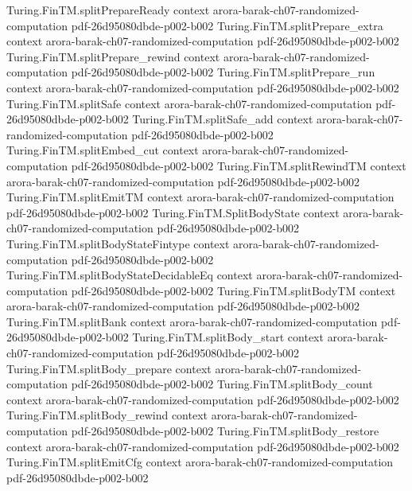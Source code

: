\begin{theorem}
  {Turing.FinTM.splitPrepareReady}
  {context}
  {arora-barak-ch07-randomized-computation}
  {pdf-26d95080dbde-p002-b002}
\proofstep
  {Turing.FinTM.splitPrepare_extra}
  {context}
  {arora-barak-ch07-randomized-computation}
  {pdf-26d95080dbde-p002-b002}
\proofstep
  {Turing.FinTM.splitPrepare_rewind}
  {context}
  {arora-barak-ch07-randomized-computation}
  {pdf-26d95080dbde-p002-b002}
\proofstep
  {Turing.FinTM.splitPrepare_run}
  {context}
  {arora-barak-ch07-randomized-computation}
  {pdf-26d95080dbde-p002-b002}
\proofstep
  {Turing.FinTM.splitSafe}
  {context}
  {arora-barak-ch07-randomized-computation}
  {pdf-26d95080dbde-p002-b002}
\proofstep
  {Turing.FinTM.splitSafe_add}
  {context}
  {arora-barak-ch07-randomized-computation}
  {pdf-26d95080dbde-p002-b002}
\proofstep
  {Turing.FinTM.splitEmbed_cut}
  {context}
  {arora-barak-ch07-randomized-computation}
  {pdf-26d95080dbde-p002-b002}
\proofstep
  {Turing.FinTM.splitRewindTM}
  {context}
  {arora-barak-ch07-randomized-computation}
  {pdf-26d95080dbde-p002-b002}
\proofstep
  {Turing.FinTM.splitEmitTM}
  {context}
  {arora-barak-ch07-randomized-computation}
  {pdf-26d95080dbde-p002-b002}
\proofstep
  {Turing.FinTM.SplitBodyState}
  {context}
  {arora-barak-ch07-randomized-computation}
  {pdf-26d95080dbde-p002-b002}
\proofstep
  {Turing.FinTM.splitBodyStateFintype}
  {context}
  {arora-barak-ch07-randomized-computation}
  {pdf-26d95080dbde-p002-b002}
\proofstep
  {Turing.FinTM.splitBodyStateDecidableEq}
  {context}
  {arora-barak-ch07-randomized-computation}
  {pdf-26d95080dbde-p002-b002}
\proofstep
  {Turing.FinTM.splitBodyTM}
  {context}
  {arora-barak-ch07-randomized-computation}
  {pdf-26d95080dbde-p002-b002}
\proofstep
  {Turing.FinTM.splitBank}
  {context}
  {arora-barak-ch07-randomized-computation}
  {pdf-26d95080dbde-p002-b002}
\proofstep
  {Turing.FinTM.splitBody_start}
  {context}
  {arora-barak-ch07-randomized-computation}
  {pdf-26d95080dbde-p002-b002}
\proofstep
  {Turing.FinTM.splitBody_prepare}
  {context}
  {arora-barak-ch07-randomized-computation}
  {pdf-26d95080dbde-p002-b002}
\proofstep
  {Turing.FinTM.splitBody_count}
  {context}
  {arora-barak-ch07-randomized-computation}
  {pdf-26d95080dbde-p002-b002}
\proofstep
  {Turing.FinTM.splitBody_rewind}
  {context}
  {arora-barak-ch07-randomized-computation}
  {pdf-26d95080dbde-p002-b002}
\proofstep
  {Turing.FinTM.splitBody_restore}
  {context}
  {arora-barak-ch07-randomized-computation}
  {pdf-26d95080dbde-p002-b002}
\proofstep
  {Turing.FinTM.splitEmitCfg}
  {context}
  {arora-barak-ch07-randomized-computation}
  {pdf-26d95080dbde-p002-b002}

\end{theorem}
